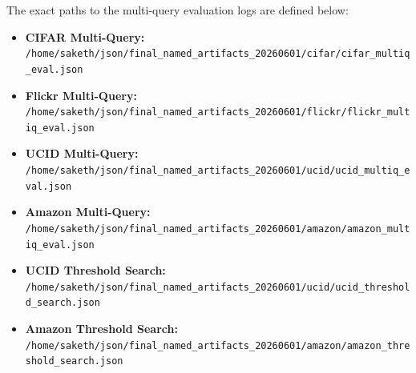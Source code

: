 \documentclass[11pt,a4paper]{article}
\begin{document}
\begin{table}[htbp]
\centering
\caption{Key Project Implementation and Evaluation Files}
\label{tab:final_files}
\end{table}

The exact paths to the multi-query evaluation logs are defined below:
\begin{itemize}
    \item \textbf{CIFAR Multi-Query:} \\ \texttt{/home/saketh/json/final\_named\_artifacts\_20260601/cifar/cifar\_multiq\_eval.json}
    \item \textbf{Flickr Multi-Query:} \\ \texttt{/home/saketh/json/final\_named\_artifacts\_20260601/flickr/flickr\_multiq\_eval.json}
    \item \textbf{UCID Multi-Query:} \\ \texttt{/home/saketh/json/final\_named\_artifacts\_20260601/ucid/ucid\_multiq\_eval.json}
    \item \textbf{Amazon Multi-Query:} \\ \texttt{/home/saketh/json/final\_named\_artifacts\_20260601/amazon/amazon\_multiq\_eval.json}
    \item \textbf{UCID Threshold Search:} \\ \texttt{/home/saketh/json/final\_named\_artifacts\_20260601/ucid/ucid\_threshold\_search.json}
    \item \textbf{Amazon Threshold Search:} \\ \texttt{/home/saketh/json/final\_named\_artifacts\_20260601/amazon/amazon\_threshold\_search.json}
\end{itemize}
\end{document}
